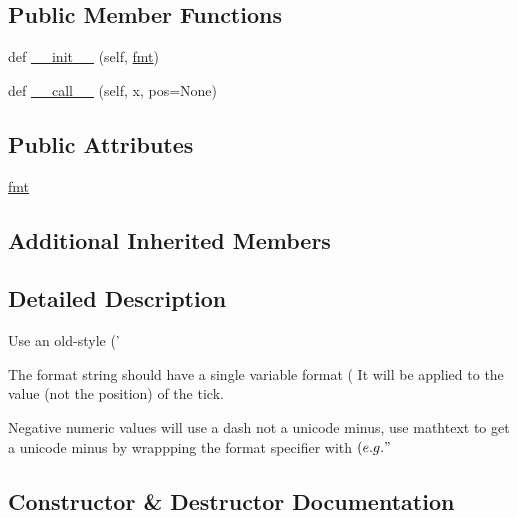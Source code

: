 \subsection*{Public Member Functions}
\begin{DoxyCompactItemize}
\item 
def \hyperlink{classmatplotlib_1_1ticker_1_1FormatStrFormatter_ac65f336692bbf4f8903e28652f9e8000}{\+\_\+\+\_\+init\+\_\+\+\_\+} (self, \hyperlink{classmatplotlib_1_1ticker_1_1FormatStrFormatter_a71ab3669e941f5c11ef742fa3b2f919b}{fmt})
\item 
def \hyperlink{classmatplotlib_1_1ticker_1_1FormatStrFormatter_a96cd85200fe1c51a1ef74aad3c7e4535}{\+\_\+\+\_\+call\+\_\+\+\_\+} (self, x, pos=None)
\end{DoxyCompactItemize}
\subsection*{Public Attributes}
\begin{DoxyCompactItemize}
\item 
\hyperlink{classmatplotlib_1_1ticker_1_1FormatStrFormatter_a71ab3669e941f5c11ef742fa3b2f919b}{fmt}
\end{DoxyCompactItemize}
\subsection*{Additional Inherited Members}


\subsection{Detailed Description}
\begin{DoxyVerb}Use an old-style ('%

The format string should have a single variable format (%
It will be applied to the value (not the position) of the tick.

Negative numeric values will use a dash not a unicode minus,
use mathtext to get a unicode minus by wrappping the format specifier
with $ (e.g. "$%
\end{DoxyVerb}
 

\subsection{Constructor \& Destructor Documentation}
\mbox{\label{classmatplotlib_1_1ticker_1_1FormatStrFormatter_ac65f336692bbf4f8903e28652f9e8000}} 
